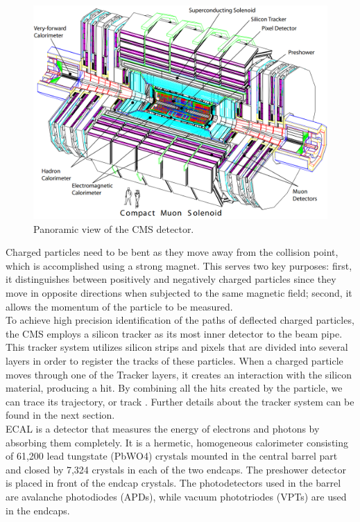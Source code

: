 \begin{center}
  \begin{figure}[ht]
    \centering
    \includegraphics[scale=.3]{Chapter2/CMS_detector_simple.png}
    \caption[Panoramic view of the CMS detector]{Panoramic view of the CMS detector.}
    \label{detector_CMS}
  \end{figure}
\end{center}

Charged particles need to be bent as they move away from the collision point, which is accomplished using a strong magnet. This serves two key purposes: first, it distinguishes between positively and negatively charged particles since they move in opposite directions when subjected to the same magnetic field; second, it allows the momentum of the particle to be measured.\\

To achieve high precision identification of the paths of deflected charged particles, the CMS employs a silicon tracker as its most inner detector to the beam pipe. This tracker system utilizes silicon strips and pixels that are divided into several layers in order to register the tracks of these particles. When a charged particle moves through one of the Tracker layers, it creates an interaction with the silicon material, producing a hit. By combining all the hits created by the particle, we can trace its trajectory, or track \cite{CMS_Exp_2008}. Further details about the tracker system can be found in the next section.\\

ECAL is a detector that measures the energy of electrons and photons by absorbing them completely. It is a hermetic, homogeneous calorimeter consisting of 61,200 lead tungstate (PbWO4) crystals mounted in the central barrel part and closed by 7,324 crystals in each of the two endcaps. The preshower detector is placed in front of the endcap crystals. The photodetectors used in the barrel are avalanche photodiodes (APDs), while vacuum phototriodes (VPTs) are used in the endcaps.\\ 

